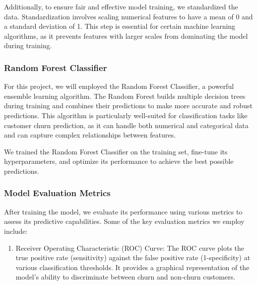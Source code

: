 \documentclass{article}
\begin{document}
\begin{multicols}{2}
Additionally, to ensure fair and effective model training, we standardized the data. Standardization involves scaling numerical features to have a mean of 0 and a standard deviation of 1. This step is essential for certain machine learning algorithms, as it prevents features with larger scales from dominating the model during training.

\subsubsection{Random Forest Classifier}

For this project, we will employed the Random Forest Classifier, a powerful ensemble learning algorithm. The Random Forest builds multiple decision trees during training and combines their predictions to make more accurate and robust predictions. This algorithm is particularly well-suited for classification tasks like customer churn prediction, as it can handle both numerical and categorical data and can capture complex relationships between features.

We trained the Random Forest Classifier on the training set, fine-tune its hyperparameters, and optimize its performance to achieve the best possible predictions.

\subsubsection{Model Evaluation Metrics}

After training the model, we evaluate its performance using various metrics to assess its predictive capabilities. Some of the key evaluation metrics we employ include: 

\begin{enumerate}
    \item Receiver Operating Characteristic (ROC) Curve: The ROC curve plots the true positive rate (sensitivity) against the false positive rate (1-specificity) at various classification thresholds. It provides a graphical representation of the model's ability to discriminate between churn and non-churn customers.


\end{enumerate}
\end{multicols}
\end{document}
